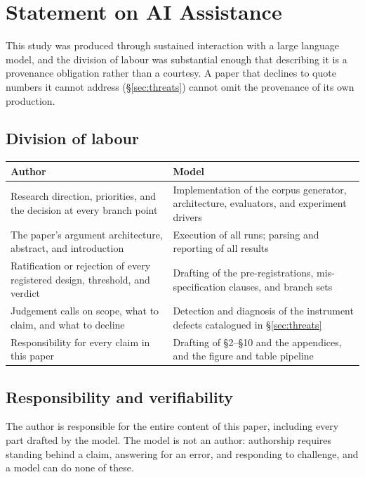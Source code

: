 \section{Statement on AI Assistance}
\label{sec:ai}

This study was produced through sustained interaction with a large language model, and the division
of labour was substantial enough that describing it is a provenance obligation rather than a
courtesy. A paper that declines to quote numbers it cannot address (\S\ref{sec:threats}) cannot omit
the provenance of its own production.

\subsection*{Division of labour}

\begin{center}\small
\begin{tabular}{@{}p{5.6cm}p{7.0cm}@{}}
\toprule
\textbf{Author} & \textbf{Model} \\
\midrule
Research direction, priorities, and the decision at every branch point & Implementation of the
corpus generator, architecture, evaluators, and experiment drivers \\
The paper's argument architecture, abstract, and introduction & Execution of all runs; parsing and
reporting of all results \\
Ratification or rejection of every registered design, threshold, and verdict & Drafting of the
pre-registrations, mis-specification clauses, and branch sets \\
Judgement calls on scope, what to claim, and what to decline & Detection and diagnosis of the
instrument defects catalogued in \S\ref{sec:threats} \\
Responsibility for every claim in this paper & Drafting of \S2--\S10 and the appendices, and the
figure and table pipeline \\
\bottomrule
\end{tabular}
\end{center}

\subsection*{Responsibility and verifiability}

The author is responsible for the entire content of this paper, including every part drafted by the
model. The model is not an author: authorship requires standing behind a claim, answering for an
error, and responding to challenge, and a model can do none of these.

